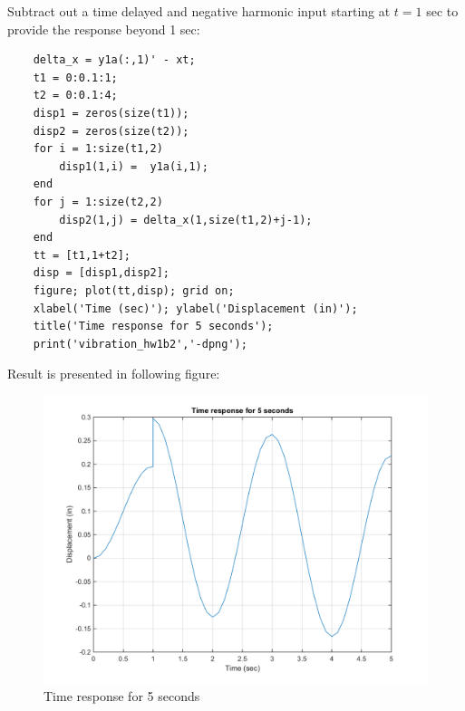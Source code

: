 \documentclass[14pt,a4paper]{article}
\begin{document}
\begin{enumerate}
	Subtract out a time delayed and negative harmonic input starting at $t = 1$ sec to provide the response beyond 1 sec:
	\begin{lstlisting}
	delta_x = y1a(:,1)' - xt;
	t1 = 0:0.1:1;
	t2 = 0:0.1:4;
	disp1 = zeros(size(t1));
	disp2 = zeros(size(t2));
	for i = 1:size(t1,2)
	    disp1(1,i) =  y1a(i,1);
	end
	for j = 1:size(t2,2)
	    disp2(1,j) = delta_x(1,size(t1,2)+j-1);
	end
	tt = [t1,1+t2];
	disp = [disp1,disp2];
	figure; plot(tt,disp); grid on;
	xlabel('Time (sec)'); ylabel('Displacement (in)');
	title('Time response for 5 seconds');
	print('vibration_hw1b2','-dpng');
	\end{lstlisting}
	\label{Figure 3 - Time response}
	Result is presented in following figure:
	\begin{figure}[htp]
		\centering
		\includegraphics[scale =0.7]{vibration_hw1b2.png}
		\caption{Time response for 5 seconds}
	\end{figure}
		

\end{enumerate}
\end{document}
